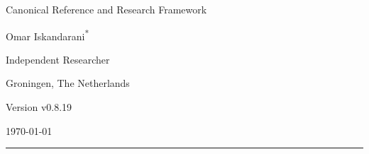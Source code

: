 \documentclass[11pt]{article}
\theoremstyle{definition}
\theoremstyle{plain}
\theoremstyle{remark}
\begin{document}
    
    \thispagestyle{empty}

    \begin{center}
        \vspace*{0.06\textheight}

        {\LARGE\bfseries \papertitle\par}
        \vspace{0.45cm}

        {\large Canonical Reference and Research Framework\par}
        \vspace{1.0cm}

        {\Large Omar Iskandarani\textsuperscript{*}\par}
        \vspace{0.35cm}

        {\normalsize Independent Researcher\par}
        {\normalsize Groningen, The Netherlands\par}
        \vspace{0.6cm}

        {\normalsize Version v0.8.19\par}
        {\normalsize \today\par}
        \vspace{0.9cm}

        \rule{0.82\textwidth}{0.5pt}
        \vspace{0.7cm}
    \end{center}

    \begin{abstract}
        \noindent
        This document presents Swirl-String Theory (SST) as a structured canonical synthesis rather than as a claim that every phenomenological sector has already been derived to theorem level. The text consolidates the primitive constant chain linking the effective fluid density, characteristic swirl speed, Compton anchoring, and horn/circulation scale; records delay-induced mode selection as the preferred non-operator route to spectral discreteness; and organizes the atomic bridge, spectroscopic filter, relational-time sector, and topology-based mass program within one explicitly stratified framework. Throughout, orthodox inputs, SST-internal derivations, bridge-level constructions, and conjectural extensions are kept distinct so that the canon remains internally coherent, externally comparable, and open to falsification.
    \end{abstract}
\end{document}
